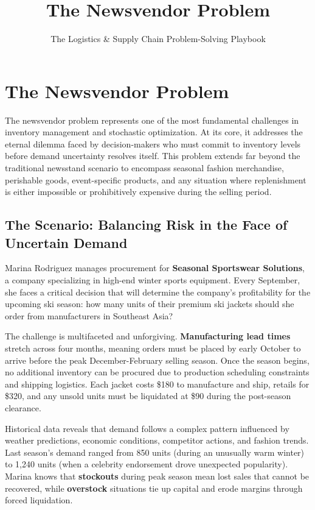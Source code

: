 \documentclass{article}
\title{The Newsvendor Problem}
\author{The Logistics \& Supply Chain Problem-Solving Playbook}
\date{}
\begin{document}
\maketitle

\section{The Newsvendor Problem}

The newsvendor problem represents one of the most fundamental challenges in inventory management and stochastic optimization. At its core, it addresses the eternal dilemma faced by decision-makers who must commit to inventory levels before demand uncertainty resolves itself. This problem extends far beyond the traditional newsstand scenario to encompass seasonal fashion merchandise, perishable goods, event-specific products, and any situation where replenishment is either impossible or prohibitively expensive during the selling period.

\subsection{The Scenario: Balancing Risk in the Face of Uncertain Demand}

Marina Rodriguez manages procurement for \textbf{Seasonal Sportswear Solutions}, a company specializing in high-end winter sports equipment. Every September, she faces a critical decision that will determine the company's profitability for the upcoming ski season: how many units of their premium ski jackets should she order from manufacturers in Southeast Asia?

The challenge is multifaceted and unforgiving. \textbf{Manufacturing lead times} stretch across four months, meaning orders must be placed by early October to arrive before the peak December-February selling season. Once the season begins, no additional inventory can be procured due to production scheduling constraints and shipping logistics. Each jacket costs \$180 to manufacture and ship, retails for \$320, and any unsold units must be liquidated at \$90 during the post-season clearance.

Historical data reveals that demand follows a complex pattern influenced by weather predictions, economic conditions, competitor actions, and fashion trends. Last season's demand ranged from 850 units (during an unusually warm winter) to 1,240 units (when a celebrity endorsement drove unexpected popularity). Marina knows that \textbf{stockouts} during peak season mean lost sales that cannot be recovered, while \textbf{overstock} situations tie up capital and erode margins through forced liquidation.
\end{document}
